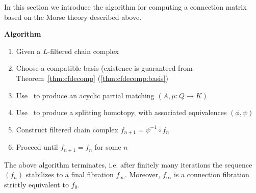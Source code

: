 In this section we introduce the algorithm for computing a connection matrix based on the Morse theory described above.

{\bf Algorithm}
\begin{enumerate}
\item Given a $L$-filtered chain complex
\item Choose a compatible basis (existence is guaranteed from Theorem~\ref{thm:cfdecomp} (\ref{thm:cfdecomp:basis})
\item Use~\cite[Algorithm 3.6]{focm} to produce an acyclic partial matching $(A,\mu:Q\to K)$
\item Use~\cite[Algorithm 3.12]{focm} to produce a splitting homotopy, with associated equivalences $(\phi,\psi)$
\item Construct filtered chain complex $f_{n+1}=\psi^{-1}\circ f_n$
\item Proceed until $f_{n+1}=f_n$ for some $n$
\end{enumerate}

\begin{prop}
 The above algorithm terminates, i.e. after finitely many iterations the sequence $(f_n)$ stabilizes to a final fibration $f_\infty$.  Moreover, $f_\infty$ is a connection fibration strictly equivalent to $f_0$.
\end{prop}






 
